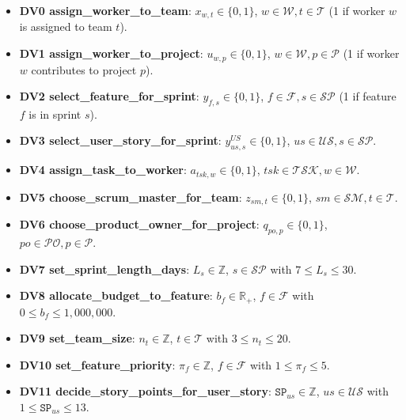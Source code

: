 \documentclass[11pt,a4paper]{article}
\begin{document}
\begin{itemize}[leftmargin=2em]
  \item \textbf{DV0 \; assign\_worker\_to\_team}:
  $x_{w,t}\in\{0,1\}$, $w\in\mathcal{W}, t\in\mathcal{T}$ (1 if worker $w$ is assigned to team $t$).
  \item \textbf{DV1 \; assign\_worker\_to\_project}:
  $u_{w,p}\in\{0,1\}$, $w\in\mathcal{W}, p\in\mathcal{P}$ (1 if worker $w$ contributes to project $p$).
  \item \textbf{DV2 \; select\_feature\_for\_sprint}:
  $y_{f,s}\in\{0,1\}$, $f\in\mathcal{F}, s\in\mathcal{S\!P}$ (1 if feature $f$ is in sprint $s$).
  \item \textbf{DV3 \; select\_user\_story\_for\_sprint}:
  $y^{US}_{us,s}\in\{0,1\}$, $us\in\mathcal{U\!S}, s\in\mathcal{S\!P}$.
  \item \textbf{DV4 \; assign\_task\_to\_worker}:
  $a_{tsk,w}\in\{0,1\}$, $tsk\in\mathcal{T\!S\!K}, w\in\mathcal{W}$.
  \item \textbf{DV5 \; choose\_scrum\_master\_for\_team}:
  $z_{sm,t}\in\{0,1\}$, $sm\in\mathcal{S\!M}, t\in\mathcal{T}$.
  \item \textbf{DV6 \; choose\_product\_owner\_for\_project}:
  $q_{po,p}\in\{0,1\}$, $po\in\mathcal{P\!O}, p\in\mathcal{P}$.
  \item \textbf{DV7 \; set\_sprint\_length\_days}:
  $L_s\in\mathbb{Z}$, $s\in\mathcal{S\!P}$ with $7\le L_s\le 30$.
  \item \textbf{DV8 \; allocate\_budget\_to\_feature}:
  $b_f\in\mathbb{R}_{+}$, $f\in\mathcal{F}$ with $0\le b_f\le 1{,}000{,}000$.
  \item \textbf{DV9 \; set\_team\_size}:
  $n_t\in\mathbb{Z}$, $t\in\mathcal{T}$ with $3\le n_t\le 20$.
  \item \textbf{DV10 \; set\_feature\_priority}:
  $\pi_f\in\mathbb{Z}$, $f\in\mathcal{F}$ with $1\le \pi_f\le 5$.
  \item \textbf{DV11 \; decide\_story\_points\_for\_user\_story}:
  $\texttt{SP}_{us}\in\mathbb{Z}$, $us\in\mathcal{U\!S}$ with $1\le \texttt{SP}_{us}\le 13$.
\end{itemize}
\end{document}

